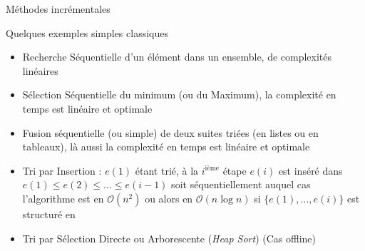 \documentclass[aspectratio=1610,francais,envcountsect]{beamer}
\begin{document}
\begin{frame}[allowframebreaks]{Méthodes incrémentales}
\begin{exampleblock}{Quelques exemples simples classiques}
  \begin{itemize}
  \item Recherche Séquentielle d’un élément dans un ensemble, de
    complexités linéaires
  \item Sélection Séquentielle du minimum (ou du Maximum), la
    complexité en temps est linéaire et optimale
  \item Fusion séquentielle (ou simple) de deux suites triées (en
    listes ou en tableaux), là aussi la complexité en temps est
    linéaire et optimale
  \item Tri par Insertion : $e(1)$ étant trié, à la $i^\text{ième}$
    étape $e(i)$ est inséré dans
    $e(1) \leq e(2) \leq \ldots \leq e(i - 1)$ soit séquentiellement
    auquel cas l’algorithme est en $\mathcal{O}(n^2)$ ou alors en
    $\mathcal{O}(n\log n)$ si $\{e(1), \ldots , e(i)\}$ est structuré
    en 
  \item Tri par Sélection Directe ou Arborescente (\emph{Heap Sort})
    (Cas offline)
  \end{itemize}
\end{exampleblock}


\end{frame}

\newcommand{\drawECTer}{%
  \node[point] (n1) at (0,0) {}; \node[point] (n2) at (2,-2) {};
  \node[point] (n3) at (5,-3) {}; \node[point] (n4) at (6,-0.5) {};
  \node[point] (n5) at (6,0.75) {}; \node[point] (n6) at (3.5,1.75)
  {}; \node[point] (n7) at (1,1.5) {}; }
\end{document}
